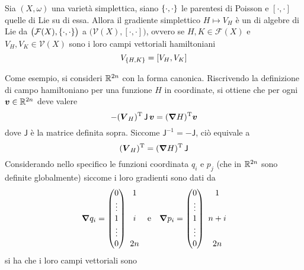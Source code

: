 \begin{theorem}
  Sia $(X, \omega)$ una varietà simplettica, siano $\pb{\cdot}{\cdot}$ le parentesi di Poisson e $[\cdot , \cdot ]$ quelle di Lie su di essa. Allora il gradiente simplettico $H \mapsto V_H$ è un  di algebre di Lie da $\big(\mathcal{F}(X), \pb{\cdot}{\cdot} \big)$ a $\big(\mathcal{V}(X), [\cdot , \cdot]\big)$, ovvero se $H,K \in \mathcal{F}(X)$ e $V_H, V_K \in \mathcal{V}(X)$ sono i loro campi vettoriali hamiltoniani \begin{equation}
  V_{\pb{H}{K}} = [V_H, V_K]
  \end{equation} 
\end{theorem}

Come esempio, si consideri $\mathbb{R}^{2n}$ con la forma canonica. Riscrivendo la definizione di campo hamiltoniano per una funzione $H$ in coordinate, si ottiene che per ogni $\boldsymbol{v} \in \mathbb{R}^{2n}$ deve valere
\begin{equation}
-(\boldsymbol{V}_H)^{\mathrm{T}}\, \mathsf{J}\, \boldsymbol{v} = (\grad{H})^{\mathrm{T}} \boldsymbol{v}
\end{equation}
dove $\mathsf{J}$ è la matrice definita sopra. Siccome $\mathsf{J}^{-1} = -\mathsf{J}$, ciò equivale a 
\begin{equation}
(\boldsymbol{V}_H)^{\mathrm{T}} = (\grad{H})^{\mathrm{T}}\, \mathsf{J}
\end{equation} 
Considerando nello specifico le funzioni coordinata $q_i$ e $p_j$ (che in $\mathbb{R}^{2n}$ sono definite globalmente) siccome i loro gradienti sono dati da
\begin{equation}
\grad{q_i} = \pmqty{0 \\ \vdots \\ 1 \\ \vdots \\ 0}\ \mqty{1 \\ \phantom{\vdots} \\ i \\ \phantom{\vdots} \\ 2n} \qqtext{e} 
\grad{p_i} = \pmqty{0 \\ \vdots \\ 1 \\ \vdots \\ 0}\ \mqty{1 \\ \phantom{\vdots} \\ n+i \\ \phantom{\vdots} \\ 2n}
\end{equation} 
si ha che i loro campi vettoriali sono 
